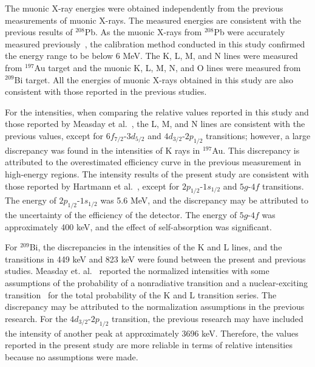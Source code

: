The muonic X-ray energies were obtained independently from the previous measurements of muonic X-rays. 
The measured energies are consistent with the previous results of $^{208}$Pb.
As the muonic X-rays from $^{208}$Pb were accurately measured previously~\cite{Bergem1988-nf}, the calibration method conducted in this study confirmed the energy range to be below 6 MeV.
The K, L, M, and N lines were measured from $^{197}$Au target and the muonic K, L, M, N, and O lines were measured from $^{209}$Bi target.
All the energies of muonic X-rays obtained in this study are also consistent with those reported in the previous studies.


For the intensities, when comparing the relative values reported in this study and those reported by Measday et al.~\cite{Measday2007-zh}, the L, M, and N lines are consistent with the previous values, except for $6f_{7/2}$-$3d_{5/2}$ and $4d_{3/2}$-$2p_{1/2}$ transitions; however, a large discrepancy was found in the intensities of K rays in $^{197}$Au. 
This discrepancy is attributed to the overestimated efficiency curve in the previous measurement in high-energy regions. 
The intensity results of the present study are consistent with those reported by Hartmann et al.~\cite{Hartmann1982-wi}, except for $2p_{1/2}$-$1s_{1/2}$ and $5g$-$4f$ transitions. The energy of $2p_{1/2}$-$1s_{1/2}$ was 5.6 MeV, and the discrepancy may be attributed to the uncertainty of the efficiency of the detector. The energy of $5g$-$4f$ was approximately 400 keV, and the effect of self-absorption was significant. 

For $^{209}$Bi, the discrepancies in the intensities of the K and L lines, and the transitions in 449 keV and 823 keV were found between the present and previous studies. 
Measday et. al.~\cite{Measday2007-zh} reported the normalized intensities with some assumptions of the probability of a nonradiative transition and a nuclear-exciting transition~\cite{Measday2007-zh} for the total probability of the K and L transition series. The discrepancy may be attributed to the normalization assumptions in the previous research. 
For the $4d_{3/2}$-$2p_{1/2}$ transition, the previous research may have included the intensity of another peak at approximately 3696 keV. 
Therefore, the values reported in the present study are more reliable in terms of relative intensities because no assumptions were made.

